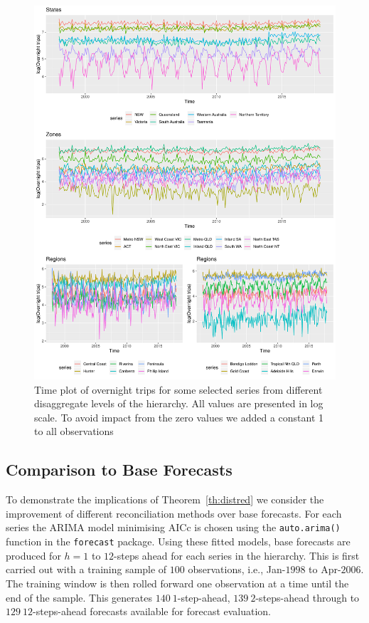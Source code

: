 \documentclass[12pt]{article}
\theoremstyle{definition}
\begin{document}
\begin{figure}
		\centering
		\small
		\includegraphics[width= \textwidth]{Empirical-results/TS-plots/States_Zones_Regs_TSplots1.pdf}
		\caption{Time plot of overnight trips for some selected series from different disaggregate levels of the hierarchy. All values are presented in log scale. To avoid impact from the zero values we added a constant 1 to all observations}\label{fig:States_Zones_Regs_TSplots}
\end{figure}

    \subsection{Comparison to Base Forecasts}\label{sec:comparebase}

    To demonstrate the implications of Theorem~\ref{th:distred} we consider the improvement of different reconciliation methods over base forecasts.  For each series the ARIMA model minimising AICc is chosen using the \verb|auto.arima()| function in the \verb|forecast| package.  Using these fitted models, base forecasts are produced for $h=1$ to $12$-steps ahead for each series in the hierarchy.  This is first carried out with a training sample of $100$ observations, i.e., Jan-$1998$ to Apr-$2006$. The training window is then rolled forward one observation at a time until the end of the sample. This generates $140~1$-step-ahead, $139~2$-steps-ahead through to $129~12$-steps-ahead forecasts available for forecast evaluation.
\end{document}

